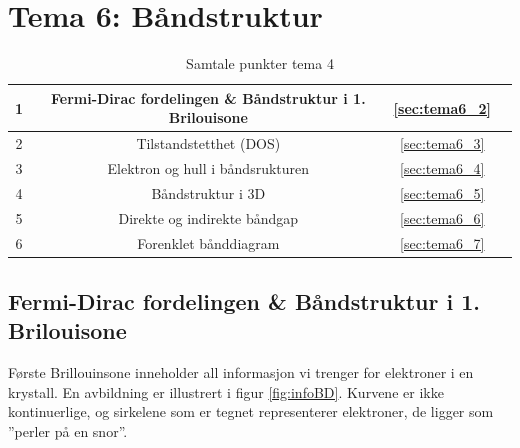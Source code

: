 \section{Tema 6: Båndstruktur}
\label{tema6}


\begin{table}[!htb]
    \centering
    \caption{Samtale punkter tema 4}
    \begin{tabular}{|c|c|c|r|}
      \hline 
      1 & Fermi-Dirac fordelingen \& Båndstruktur i 1. Brilouisone & \autoref{sec:tema6_2} & \quad\quad \cellcolor{blue} \\
      \hline
      2 & Tilstandstetthet (DOS) & \autoref{sec:tema6_3} & \cellcolor{red} \\
      \hline
      3 & Elektron og hull i båndsrukturen & \autoref{sec:tema6_4} & \cellcolor{blue} \\
      \hline 
      4 & Båndstruktur i 3D & \autoref{sec:tema6_5} & \cellcolor{blue} \\
      \hline
      5 & Direkte og indirekte båndgap & \autoref{sec:tema6_6} & \cellcolor{blue} \\ 
      \hline
      6 & Forenklet bånddiagram & \autoref{sec:tema6_7} & \cellcolor{blue} \\
      \hline
    \end{tabular}
    \label{tab:samtalePunkt_tema1}
\end{table}


\subsection{Fermi-Dirac fordelingen \& Båndstruktur i 1. Brilouisone}
\label{sec:tema6_2}
Første Brillouinsone inneholder all informasjon vi trenger for elektroner i en krystall. En avbildning er illustrert i figur \ref{fig:infoBD}. Kurvene er ikke kontinuerlige, og sirkelene som er tegnet representerer elektroner, de ligger som ''perler på en snor''. 

